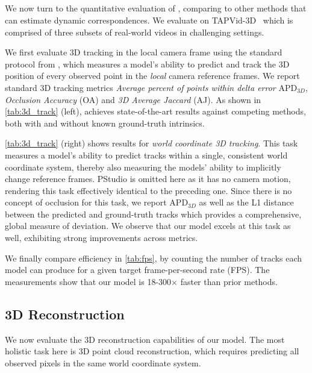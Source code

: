 \subsection{\task}
\label{sec:exp:4d}



We now turn to the quantitative evaluation of \task, comparing \name to other methods that can estimate dynamic correspondences.
We evaluate on TAPVid-3D~\cite{koppula2024tapvid} which is comprised of three subsets of real-world videos in challenging settings.

We first evaluate 3D tracking in the local camera frame using the standard protocol from \citet{koppula2024tapvid}, which measures a model's ability to predict and track the 3D position of every observed point in the \emph{local} camera reference frames.
We report standard 3D tracking metrics \emph{Average percent of points within delta error} $\text{APD}_{3D}$, \emph{Occlusion Accuracy} (OA) and \emph{3D Average Jaccard} (AJ).
As shown in \cref{tab:3d_track} (left), \name achieves state-of-the-art results against competing methods, both with and without known ground-truth intrinsics.

\cref{tab:3d_track} (right) shows results for \emph{world coordinate 3D tracking}.
This task measures a model's ability to predict tracks within a single, consistent world coordinate system, thereby also measuring the models' ability to implicitly change reference frames.
PStudio is omitted here as it has no camera motion, rendering this task effectively identical to the preceding one.
Since there is no concept of occlusion for this task, we report $\text{APD}_{3D}$ as well as the L1 distance between the predicted and ground-truth tracks which provides a comprehensive, global measure of deviation.
We observe that our model excels at this task as well, exhibiting strong improvements across metrics.

We finally compare efficiency in
\cref{tab:fps}, by counting the number of tracks each model can produce for a given target frame-per-second rate (FPS).
The measurements show that our model is 18-300$\times$ faster than prior methods.



\subsection{3D Reconstruction}
\label{sec:exp:3d}

We now evaluate the 3D reconstruction capabilities of our model.
The most holistic task here is 3D point cloud reconstruction, which requires predicting all observed pixels in the same world coordinate system.

